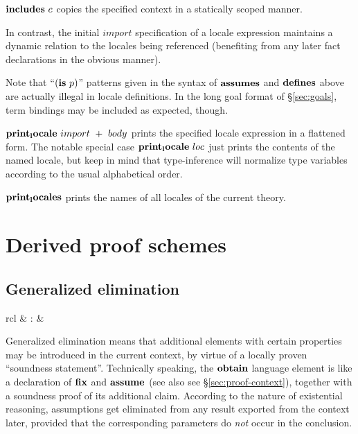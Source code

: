 \begin{descr}
\begin{descr}
  \item [${\mathord{\mathbf{includes}}}~c$] copies the specified context in a statically scoped
    manner.

    In contrast, the initial $import$ specification of a locale expression
    maintains a dynamic relation to the locales being referenced (benefiting
    from any later fact declarations in the obvious manner).
  \end{descr}

  Note that ``$({\mathord{\mathbf{is}}}~p)$'' patterns given in the syntax of ${\mathord{\mathbf{assumes}}}$ and
  ${\mathord{\mathbf{defines}}}$ above are actually illegal in locale definitions.  In the
  long goal format of \S\ref{sec:goals}, term bindings may be included as
  expected, though.

\item [${\mathord{\mathbf{print_locale}}}~import~+~body$] prints the specified locale
  expression in a flattened form.  The notable special case
  ${\mathord{\mathbf{print_locale}}}~loc$ just prints the contents of the named
  locale, but keep in mind that type-inference will normalize type variables
  according to the usual alphabetical order.

\item [${\mathord{\mathbf{print_locales}}}$] prints the names of all locales of the
  current theory.

\end{descr}


\section{Derived proof schemes}

\subsection{Generalized elimination}\label{sec:obtain}

\begin{matharray}{rcl}
   & : &  \\
\end{matharray}

Generalized elimination means that additional elements with certain properties
may be introduced in the current context, by virtue of a locally proven
``soundness statement''.  Technically speaking, the ${\mathord{\mathbf{obtain}}}$ language
element is like a declaration of ${\mathord{\mathbf{fix}}}$ and ${\mathord{\mathbf{assume}}}$ (see also see
\S\ref{sec:proof-context}), together with a soundness proof of its additional
claim.  According to the nature of existential reasoning, assumptions get
eliminated from any result exported from the context later, provided that the
corresponding parameters do \emph{not} occur in the conclusion.

